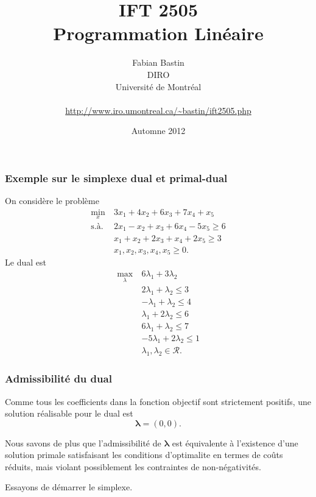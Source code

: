 \documentclass[t,usepdftitle=false]{beamer}
\title[IFT2505]{IFT 2505\\Programmation Linéaire}
\author[Fabian Bastin]{Fabian Bastin\\DIRO\\Université de Montréal\\\mbox{}\\\url{http://www.iro.umontreal.ca/~bastin/ift2505.php}}
\date{Automne 2012}
\def\blambda{\boldsymbol{\lambda}}
\def\cR{\mathcal{R}}
\begin{document}
\frame{\titlepage}


\begin{frame}
\frametitle{Exemple sur le simplexe dual et primal-dual}

On considère le problème
\begin{align*}
\min_{x}\ & 3x_1 + 4x_2 + 6x_3 + 7x_4 + x_5 \\
\mbox{s.à. } & 2x_1 - x_2 + x_3 +6x_4 - 5x_5 \geq 6 \\
& x_1 + x_2 + 2x_3 + x_4 + 2x_5 \geq 3 \\
& x_1, x_2, x_3, x_4, x_5 \geq 0.
\end{align*}
Le dual est
\begin{align*}
\max_{\lambda}\ & 6\lambda_1 + 3\lambda_2 \\
& 2\lambda_1 + \lambda_2 \leq 3 \\
& -\lambda_1 + \lambda_2 \leq 4 \\
& \lambda_1 + 2\lambda_2 \leq 6 \\
& 6\lambda_1 + \lambda_2 \leq 7 \\
& -5\lambda_1 + 2\lambda_2 \leq 1 \\
& \lambda_1, \lambda_2 \in \cR.
\end{align*}

\end{frame}

\begin{frame}
\frametitle{Admissibilité du dual}

Comme tous les coefficients dans la fonction objectif sont strictement positifs, une solution réalisable pour le dual est
\[
\blambda = (0,0).
\]

\mbox{}

Nous savons de plus que l'admissibilité de $\blambda$ est équivalente à l'existence d'une solution primale satisfaisant les conditions d'optimalite en termes de coûts réduits, mais violant possiblement les contraintes de non-négativités.

\mbox{}

Essayons de démarrer le simplexe.

\end{frame}
\end{document}
